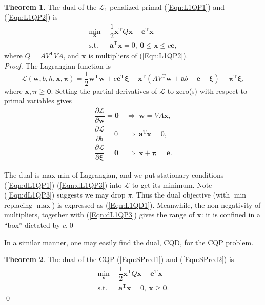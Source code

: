 \documentclass[11pt,a4paper]{article}
\theoremstyle{definition}
\newtheorem{theo}{Theorem}
\renewcommand{\vec}[1]{\boldsymbol{#1}}
\begin{document}
      \begin{theo}
        The dual of the $\mathcal{L}_{1}$-penalized primal (\ref{Eqn:L1QP1}) and (\ref{Eqn:L1QP2}) is
        \begin{align}
          \min_{\vec{x}}~~ & \dfrac{1}{2}\vec{x}^{\mathrm{T}}Q\vec{x}-\vec{e}^{\mathrm{T}}\vec{x} \label{Eqn:L1QD1}\\
          \text{s.t.}~~ & \vec{a}^{\mathrm{T}}\vec{x}=0,~\vec{0}\leq\vec{x}\leq c\vec{e}, \label{Eqn:L1QD2}
        \end{align}
        where $Q=AV^{\mathrm{T}}VA$, and $\vec{x}$ is multipliers of (\ref{Eqn:L1QP2}).\\
        \textit{Proof.} The Lagrangian function is
        \begin{equation}
          \mathcal{L}(\vec{w},b,h,\vec{x},\vec{\pi})=\dfrac{1}{2}\vec{w}^{\mathrm{T}}\vec{w}+c\vec{e}^{\mathrm{T}}\vec{\xi}-\vec{x}^{\mathrm{T}}(AV^{\mathrm{T}}\vec{w}+\vec{a}b-\vec{e}+\vec{\xi})-\vec{\pi}^{\mathrm{T}}\vec{\xi},
        \end{equation}
        where $\vec{x},\vec{\pi}\geq\vec{0}$. Setting the partial derivatives of $\mathcal{L}$ to zero(s) with respect to primal variables gives
        \begin{align}
          \dfrac{\partial\mathcal{L}}{\partial\vec{w}}=\vec{0} ~ & \Rightarrow ~ \vec{w}=VA\vec{x}, \label{Eqn:dL1QP1}\\
          \dfrac{\partial\mathcal{L}}{\partial b}=0 ~ & \Rightarrow ~ \vec{a}^{\mathrm{T}}\vec{x}=0, \label{Eqn:dL1QP2}\\
          \dfrac{\partial\mathcal{L}}{\partial\vec{\xi}}=\vec{0} ~ & \Rightarrow ~ \vec{x}+\vec{\pi}=\vec{e}. \label{Eqn:dL1QP3}
        \end{align}

        The dual is max-min of Lagrangian, and we put stationary conditions (\ref{Eqn:dL1QP1})-(\ref{Eqn:dL1QP3}) into $\mathcal{L}$ to get its minimum. Note (\ref{Eqn:dL1QP3}) suggests we may drop $\pi$. Thus the dual objective (with $\min$ replacing $\max$) is expressed as (\ref{Eqn:L1QD1}). Meanwhile, the non-negativity of multipliers, together with (\ref{Eqn:dL1QP3}) gives the range of $\vec{x}$: it is confined in a ``box'' dictated by $c$.\qed
      \end{theo}

      In a similar manner, one may easily find the dual, CQD, for the CQP problem.

      \begin{theo}
        The dual of the CQP (\ref{Eqn:SPred1}) and (\ref{Eqn:SPred2}) is
        \begin{align}
          \min_{\vec{x}}~~ & \dfrac{1}{2}\vec{x}^{\mathrm{T}}Q\vec{x}-\vec{e}^{\mathrm{T}}\vec{x} \label{Eqn:CQD1}\\
          \text{s.t.}~~ & \vec{a}^{\mathrm{T}}\vec{x}=0,~\vec{x}\geq\vec{0}. \label{Eqn:CQD2}
        \end{align}\qed
      \end{theo}
\end{document}
